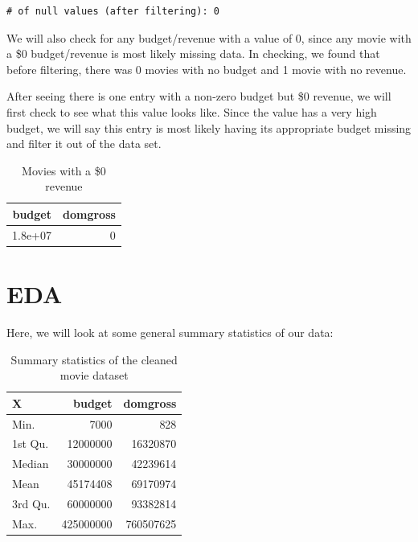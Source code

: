 \documentclass[
  letterpaper,
  DIV=11,
  numbers=noendperiod]{scrartcl}
\begin{document}
\begin{verbatim}
# of null values (after filtering): 0
\end{verbatim}

We will also check for any budget/revenue with a value of 0, since any
movie with a \$0 budget/revenue is most likely missing data. In
checking, we found that before filtering, there was 0 movies with no
budget and 1 movie with no revenue.

After seeing there is one entry with a non-zero budget but \$0 revenue,
we will first check to see what this value looks like. Since the value
has a very high budget, we will say this entry is most likely having its
appropriate budget missing and filter it out of the data set.

\begin{longtable}[]{@{}rr@{}}

\caption{\label{tbl-movie-data-rev}Movies with a \$0 revenue}

\tabularnewline

\toprule\noalign{}
budget & domgross \\
\midrule\noalign{}
\endhead
\bottomrule\noalign{}
\endlastfoot
1.8e+07 & 0 \\

\end{longtable}

\section{EDA}\label{eda}

Here, we will look at some general summary statistics of our data:

\begin{longtable}[]{@{}lrr@{}}

\caption{\label{tbl-eda-summary}Summary statistics of the cleaned movie
dataset}

\tabularnewline

\toprule\noalign{}
X & budget & domgross \\
\midrule\noalign{}
\endhead
\bottomrule\noalign{}
\endlastfoot
Min. & 7000 & 828 \\
1st Qu. & 12000000 & 16320870 \\
Median & 30000000 & 42239614 \\
Mean & 45174408 & 69170974 \\
3rd Qu. & 60000000 & 93382814 \\
Max. & 425000000 & 760507625 \\

\end{longtable}
\end{document}

